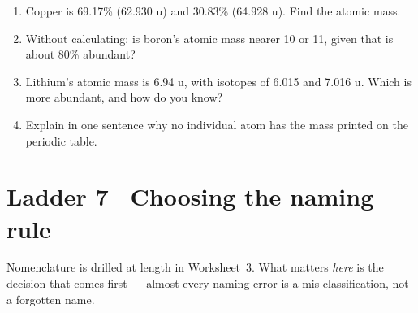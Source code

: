 \documentclass{apchem-worksheet}
\begin{document}
\begin{yourturn}
\begin{enumerate}[leftmargin=*,itemsep=0.5em]
  \item Copper is 69.17\%  (62.930 u) and 30.83\%
         (64.928 u). Find the atomic mass.
        \workspace[1.8cm]
  \item Without calculating: is boron's atomic mass nearer 10 or 11,
        given that  is about 80\% abundant?
        \workspace[1.4cm]
  \item Lithium's atomic mass is 6.94 u, with isotopes of 6.015 and
        7.016 u. Which is more abundant, and how do you know?
        \workspace[1.6cm]
  \item Explain in one sentence why no individual atom has the mass
        printed on the periodic table. \workspace[1.4cm]
\end{enumerate}
\end{yourturn}

\section*{\sffamily Ladder 7 \textbullet\ Choosing the naming rule}

Nomenclature is drilled at length in Worksheet~3. What matters \emph{here}
is the decision that comes first --- almost every naming error is a
mis-classification, not a forgotten name.
\end{document}
